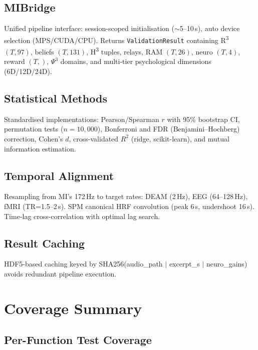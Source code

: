 \documentclass[10pt,twocolumn]{article}
\newcommand{\Rthree}{R\textsuperscript{3}}
\newcommand{\Hthree}{H\textsuperscript{3}}
\newcommand{\PsiThree}{\ensuremath{\Psi^{3}}}
\begin{document}
\subsection{MIBridge}

Unified pipeline interface: session-scoped initialisation ($\sim$5--10\,s), auto device selection (MPS/CUDA/CPU). Returns \texttt{ValidationResult} containing \Rthree{} $(T,97)$, beliefs $(T,131)$, \Hthree{} tuples, relays, RAM $(T,26)$, neuro $(T,4)$, reward $(T,)$, \PsiThree{} domains, and multi-tier psychological dimensions (6D/12D/24D).

\subsection{Statistical Methods}

Standardised implementations: Pearson/Spearman $r$ with 95\% bootstrap CI, permutation tests ($n\!=\!10{,}000$), Bonferroni and FDR (Benjamini--Hochberg) correction, Cohen's $d$, cross-validated $R^2$ (ridge, scikit-learn), and mutual information estimation.

\subsection{Temporal Alignment}

Resampling from MI's 172\,Hz to target rates: DEAM (2\,Hz), EEG (64--128\,Hz), fMRI (TR=1.5--2\,s). SPM canonical HRF convolution (peak 6\,s, undershoot 16\,s). Time-lag cross-correlation with optimal lag search.

\subsection{Result Caching}

HDF5-based caching keyed by SHA256(audio\_path $|$ excerpt\_s $|$ neuro\_gains) avoids redundant pipeline execution.

\section{Coverage Summary}
\label{sec:coverage}

\subsection{Per-Function Test Coverage}
\end{document}
